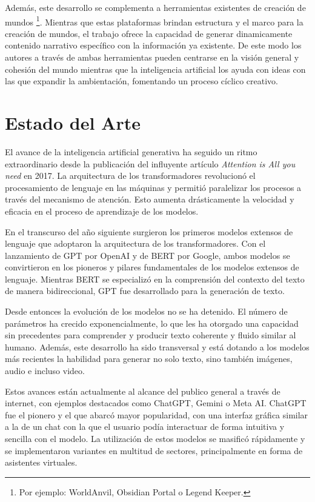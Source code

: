Además, este desarrollo se complementa a herramientas existentes de creación de mundos
\footnote{Por ejemplo: WorldAnvil, Obsidian Portal o Legend Keeper.}.
Mientras que estas plataformas brindan estructura y el marco para la creación de mundos,
el trabajo ofrece la capacidad de generar dinamicamente contenido narrativo específico con la información ya existente.
De este modo los autores a través de ambas herramientas pueden centrarse en la visión general y cohesión del mundo mientras que la inteligencia artificial 
los ayuda con ideas con las que expandir la ambientación, fomentando un proceso cíclico creativo.


\section{Estado del Arte}
El avance de la inteligencia artificial generativa ha seguido un ritmo extraordinario desde
la publicación del influyente artículo \textit{Attention is All you need} \cite{att_is_all_you_need}
en 2017.
La arquitectura de los transformadores revolucionó el procesamiento de lenguaje en las máquinas y
permitió paralelizar los procesos a través del mecanismo de atención.
Esto aumenta drásticamente la velocidad y eficacia en el proceso de aprendizaje de los modelos.

En el transcurso del año siguiente surgieron los primeros modelos extensos de lenguaje
que adoptaron la arquitectura de los transformadores.
Con el lanzamiento de GPT por OpenAI y de BERT por Google, ambos modelos se convirtieron
en los pioneros y pilares fundamentales de los modelos extensos de lenguaje.
Mientras BERT se especializó en la comprensión del contexto del texto de manera bidireccional, GPT
fue desarrollado para la generación de texto.

Desde entonces la evolución de los modelos no se ha detenido. El número de parámetros
ha crecido exponencialmente, lo que les ha otorgado una capacidad sin precedentes para comprender y
producir texto coherente y fluido similar al humano.
Además, este desarrollo ha sido transversal y está dotando a los modelos más recientes 
la habilidad para generar no solo texto, sino también imágenes, audio e incluso video.

Estos avances están actualmente al alcance del publico general a través de internet, con ejemplos destacados
como ChatGPT, Gemini o Meta AI.
ChatGPT fue el pionero y el que abarcó mayor popularidad,
con una interfaz gráfica similar a la de un chat con la que el usuario podía interactuar de forma intuitiva
y sencilla con el modelo. La utilización de estos modelos se masificó rápidamente y se implementaron variantes
en multitud de sectores, principalmente en forma de asistentes virtuales.

